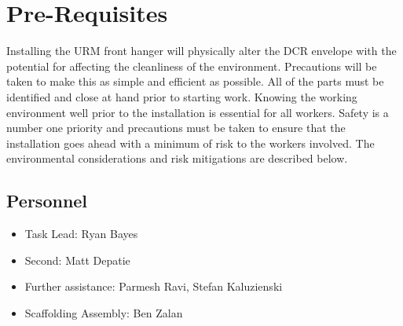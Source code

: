 \documentclass[11pt]{article}
\begin{document}
\begin{itemize}
\end{itemize}

\section{Pre-Requisites}
Installing the URM front hanger will physically alter the DCR envelope with the potential for affecting the cleanliness of the environment. Precautions will be taken to make this as simple and efficient as possible. All of the parts must be identified and close at hand prior to starting work. Knowing the working environment well prior to the installation is essential for all workers. Safety is a number one priority and precautions must be taken to ensure that the installation goes ahead with a minimum of risk to the workers involved. The environmental considerations and risk mitigations are described below.

\subsection{Personnel}
\begin{itemize}
\item Task Lead: Ryan Bayes
\item Second: Matt Depatie
\item Further assistance: Parmesh Ravi, Stefan Kaluzienski
\item Scaffolding Assembly: Ben Zalan
\end{itemize}
\end{document}
